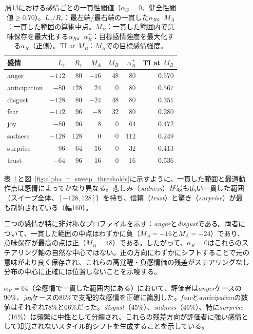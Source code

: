 \begin{table}[H]
\centering
\small
\begin{tabular}{lrrrrrr}
\toprule
\textbf{感情} & $L_e$ & $R_e$ & $M_A$ & $M_B$ & $\alpha_R^{+}$ & TI at $M_B$ \\
\midrule
anger        & $-112$ & $80$  & $-16$ & $48$ & $80$  & $0.570$ \\
anticipation & $-80$  & $128$ & $24$  & $0$  & $80$  & $0.567$ \\
disgust      & $-128$ & $80$  & $-24$ & $48$ & $80$  & $0.351$ \\
fear         & $-112$ & $96$  & $-8$  & $32$ & $80$  & $0.280$ \\
joy          & $-80$  & $96$  & $8$   & $0$  & $64$  & $0.472$ \\
sadness      & $-128$ & $128$ & $0$   & $0$  & $112$ & $0.249$ \\
surprise     & $-96$  & $64$  & $-16$ & $0$  & $32$  & $0.413$ \\
trust        & $-64$  & $96$  & $16$  & $0$  & $16$  & $0.536$ \\
\bottomrule
\end{tabular}
\caption{層13における感情ごとの一貫性閾値（$\alpha_G = 0$、健全性閾値$\geq 0.70$）。$L_e$/$R_e$：最左端/最右端の一貫した$\alpha_R$。$M_A$：一貫した範囲の算術中点。$M_B$：一貫した範囲内で意味保存を最大化する$\alpha_R$。$\alpha_R^{+}$：目標感情強度を最大化する$\alpha_R$（正側）。TI at $M_B$：$M_B$での目標感情強度。}\label{tab:alpha_r_thresholds}
\end{table}

表~\ref{tab:alpha_r_thresholds}と図~\ref{fig:alpha_r_sweep_thresholds}に示すように、一貫した範囲と最適動作点は感情によってかなり異なる。悲しみ（\textit{sadness}）が最も広い一貫した範囲（スイープ全体、$[-128, 128]$）を持ち、信頼（\textit{trust}）と驚き（\textit{surprise}）が最も制約されている（幅160）。\par

二つの感情が特に非対称なプロファイルを示す：\textit{anger}と\textit{disgust}である。両者について、一貫した範囲の中点はわずかに負（$M_A=-16$と$M_A=-24$）であり、意味保存が最高の点は正（$M_B=48$）である。したがって、$\alpha_R=0$はこれらのステアリング軸の自然な中心ではない。正の方向にわずかにシフトすることで元の意味がより良く保存され、これらの高覚醒・負感情価の残差がステアリングなし分布の中心に正確には位置しないことを示唆する。\par

$\alpha_R = 64$（全感情で一貫した範囲内にある）において、評価者は\textit{anger}ケースの90\%、\textit{joy}ケースの86\%で支配的な感情を正確に識別した。\textit{fear}と\textit{anticipation}の数値はそれぞれ78\%と66\%だった。\textit{disgust}（45\%）、\textit{sadness}（46\%）、特に\textit{surprise}（16\%）は頻繁に中性として分類され、これらの残差方向が評価者に強い感情として知覚されないスタイル的シフトを生成することを示している。\par

